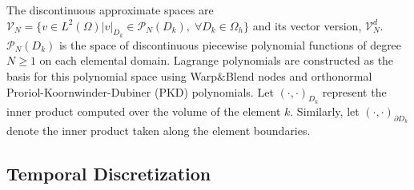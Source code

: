 \documentclass[11pt,a4paper,twoside]{article}
\begin{document}
	The discontinuous approximate spaces are $  \mathcal{V}_N  = \{ v\in L^2(\Omega)\lvert v \lvert_{D_{k}} \in \mathcal{P}_N(D_{k}), \; \forall D_{k} \in \Omega_h \} $
	and its vector version, $ \mathcal{V}_N^d $. $\mathcal{P}_N(D_{k}) $ is the space of discontinuous piecewise polynomial functions of degree $N\geq 1$ on each elemental domain. Lagrange polynomials are constructed as the basis for this polynomial space using Warp$\&$Blend nodes \cite{warburton_explicit_2006} and orthonormal Proriol-Koornwinder-Dubiner (PKD) \cite{Proriol_1957,koornwinder_1975,dubiner_spectral_1991} polynomials. Let $ (\cdot , \cdot)_{D_{k}} $ represent the inner product computed over the volume of the element $ k $. Similarly, let $ (\cdot , \cdot)_{\partial D_{k}}$ denote the inner product taken along the element boundaries. 
	
	
	\subsection{Temporal Discretization}
	
\end{document}
